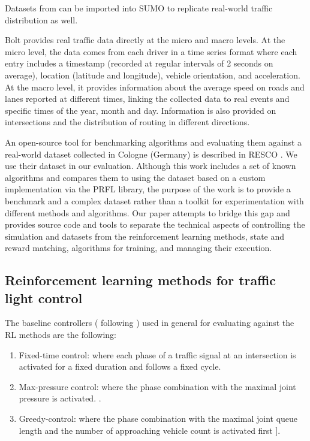 \documentclass[a4paper,twoside]{article}
\begin{document}
Datasets from \cite{MATSim} can be imported into SUMO to replicate real-world traffic distribution as well. 

Bolt \cite{BOLT} provides real traffic data directly at the micro and macro levels. At the micro level, the data comes from each driver in a time series format where each entry includes a timestamp (recorded at regular intervals of 2 seconds on average), location (latitude and longitude), vehicle orientation, and acceleration. At the macro level, it provides information about the average speed on roads and lanes reported at different times, linking the collected data to real events and specific times of the year, month and day. Information is also provided on intersections and the distribution of routing in different directions.

An open-source tool for benchmarking algorithms and evaluating them against a real-world dataset collected in Cologne (Germany) is described in RESCO \cite{ault2021reinforcement}. We use their dataset in our evaluation. Although this work includes a set of known algorithms and compares them to using the dataset based on a custom implementation via the PRFL library, the purpose of the work is to provide a benchmark and a complex dataset rather than a toolkit for experimentation with different methods and algorithms. Our paper attempts to bridge this gap and provides source code and tools to separate the technical aspects of controlling the simulation and datasets from the reinforcement learning methods, state and reward matching, algorithms for training, and managing their execution.

\subsection {Reinforcement learning methods for traffic light control}

The baseline controllers ( following \cite{ault2021reinforcement}) used in general for evaluating against the RL methods are the following:
\begin{enumerate}
	\item 
	Fixed-time control: where each phase of a traffic signal at an intersection is activated for a fixed duration and follows a fixed cycle. 
	
	\item Max-pressure control: where the phase combination with the maximal joint pressure is activated.
	\cite{MPLight}.
	
	\item Greedy-control: where the phase combination with the maximal joint queue length and the number of approaching
	vehicle count is activated first \cite{chu2019multiagent}].
	
\end{enumerate}
\end{document}
